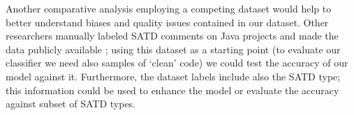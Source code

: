 Another comparative analysis employing a competing dataset would help to better understand biases and quality issues contained in our dataset. Other researchers manually labeled SATD comments on Java projects and made the data publicly available \cite{maldonado2015detecting}; using this dataset as a starting point (to evaluate our classifier we need also samples of `clean' code) we could test the accuracy of our model against it. Furthermore, the dataset labels include also the SATD type; this information could be used to enhance the model or evaluate the accuracy against subset of SATD types.







